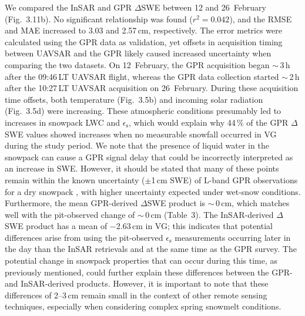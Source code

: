 We compared the InSAR and GPR $\Delta$SWE between 12 and 26~February (Fig.~3.11b). No significant relationship was found ($r^{2} = 0.042$), and the RMSE and MAE increased to 3.03 and 2.57\,cm, respectively. The error metrics were calculated using the GPR data as validation, yet offsets in acquisition timing between UAVSAR and the GPR likely caused increased uncertainty when comparing the two datasets. On 12~February, the GPR acquisition began $\sim$\,3\,h after the 09:46\,LT UAVSAR flight, whereas the GPR data collection started $\sim$\,2\,h after the 10:27\,LT UAVSAR acquisition on 26~February. During these acquisition time offsets, both temperature (Fig.~3.5b) and incoming solar radiation (Fig.~3.5d) were increasing. These atmospheric conditions presumably led to increases in snowpack LWC and $\epsilon_\mathrm{s}$, which would explain why 44\,\% of the GPR $\Delta$SWE values showed increases when no measurable snowfall occurred in VG during the study period. We note that the presence of liquid water in the snowpack can cause a GPR signal delay that could be incorrectly interpreted as an increase in SWE. However, it should be stated that many of these points remain within the known uncertainty ($\pm$1\,cm SWE) of L-band GPR observations for a dry snowpack \citep{mcgrathSpatiallyExtensiveGroundPenetrating2019}, with higher uncertainty expected under wet-snow conditions. Furthermore, the mean GPR-derived $\Delta$SWE product is $\sim$\,0\,cm, which matches well with the pit-observed change of $\sim$\,0\,cm (Table~3). The InSAR-derived $\Delta$SWE product has a mean of $-$2.63\,cm in VG; this indicates that potential differences arise from using the pit-observed $\epsilon_\mathrm{s}$ measurements occurring later in the day than the InSAR retrievals and at the same time as the GPR survey. The potential change in snowpack properties that can occur during this time, as previously mentioned, could further explain these differences between the GPR- and InSAR-derived products. However, it is important to note that these differences of 2--3\,cm remain small in the context of other remote sensing techniques, especially when considering complex spring snowmelt conditions.

